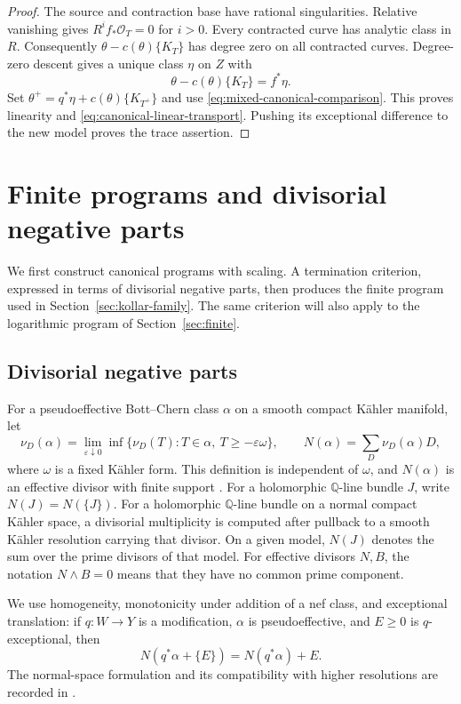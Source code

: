 \documentclass[11pt,a4paper]{article}
\numberwithin{equation}{section}
\theoremstyle{definition}
\theoremstyle{remark}
\newcommand{\Q}{\mathbb Q}\newcommand{\R}{\mathbb R}
\newcommand{\OO}{\mathcal O}\newcommand{\cX}{\mathcal X}
\begin{document}
\begin{proof}
The source and contraction base have rational singularities.
Relative vanishing gives $R^if_*\OO_T=0$ for $i>0$.
Every contracted curve has analytic class in $R$.
Consequently $\theta-c(\theta)\{K_T\}$ has degree zero on all
contracted curves. Degree-zero descent
\cite[Lemma~2.39]{HX2026} gives a unique class $\eta$ on $Z$ with
\[
 \theta-c(\theta)\{K_T\}=f^*\eta.
\]
Set $\theta^+=q^*\eta+c(\theta)\{K_{T^+}\}$ and use
\eqref{eq:mixed-canonical-comparison}. This proves linearity and
\eqref{eq:canonical-linear-transport}. Pushing its exceptional
difference to the new model proves the trace assertion.
\end{proof}

\section{Finite programs and divisorial negative parts}
\label{sec:canonical-program}

We first construct canonical programs with scaling. A termination
criterion, expressed in terms of divisorial negative parts, then
produces the finite program used in
Section~\ref{sec:kollar-family}. The same criterion will also apply
to the logarithmic program of Section~\ref{sec:finite}.

\subsection{Divisorial negative parts}
\label{subsec:negative-parts}

For a pseudoeffective Bott--Chern class $\alpha$ on a smooth compact
Kähler manifold, let
\[
 \nu_D(\alpha)=\lim_{\varepsilon\downarrow0}
  \inf\{\nu_D(T):T\in\alpha,\ T\ge-\varepsilon\omega\},
 \qquad N(\alpha)=\sum_D\nu_D(\alpha)D,
\]
where $\omega$ is a fixed Kähler form. This definition is independent
of $\omega$, and $N(\alpha)$ is an effective divisor with finite support
\cite[Sections~2--3 and Theorem~3.12]{Boucksom}. For a holomorphic
$\Q$-line bundle $J$, write $N(J)=N(\{J\})$. For a holomorphic $\Q$-line bundle on a normal compact Kähler
space, a divisorial multiplicity is computed after pullback to a
smooth Kähler resolution carrying that divisor. On a given model,
$N(J)$ denotes the sum over the prime divisors of that model. For effective divisors $N,B$, the notation
$N\wedge B=0$ means that they have no common prime component.

We use homogeneity, monotonicity under addition of a nef class, and
exceptional translation: if $q:W\to Y$ is a modification, $\alpha$
is pseudoeffective, and $E\ge0$ is $q$-exceptional, then
\begin{equation}\label{eq:exceptional-translation}
 N(q^*\alpha+\{E\})=N(q^*\alpha)+E.
\end{equation}
The normal-space formulation and its compatibility with higher
resolutions are recorded in \cite[Lemmas~2.2--2.4]{OAI034}.
\end{document}
